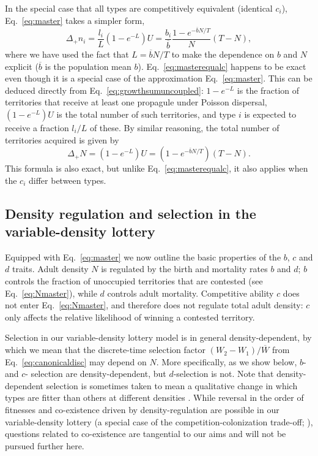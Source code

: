 \documentclass[12pt]{article}
\begin{document}
In the special case that all types are competitively equivalent (identical $c_i$), Eq.~\eqref{eq:master} takes a simpler form,
\begin{equation}
\Delta_+ n_i = \frac{l_i}{L}(1-e^{-L})U=\frac{b_i}{\overline{b}}\frac{1-e^{-\overline{b}N/T}}{N}(T-N), \label{eq:masterequalc}
\end{equation}
where we have used the fact that $L=\overline{b}N/T$ to make the dependence on $b$ and $N$ explicit ($\overline{b}$ is the population mean $b$). Eq.~\eqref{eq:masterequalc} happens to be exact even though it is a special case of the approximation Eq.~\eqref{eq:master}. This can be deduced directly from Eq.~\eqref{eq:growthsumuncoupled}: $1-e^{-L}$ is the fraction of territories that receive at least one propagule under Poisson dispersal, $(1-e^{-L})U$ is the total number of such territories, and type $i$ is expected to receive a fraction $l_i/L$ of these. By similar reasoning, the total number of territories acquired is given by
\begin{equation}
\Delta_+ N=(1-e^{-L})U=(1-e^{-\overline{b}N/T})(T-N). \label{eq:Nmaster}
\end{equation}
This formula is also exact, but unlike Eq.~\eqref{eq:masterequalc}, it also applies when the $c_i$ differ between types. 

\subsection*{Density regulation and selection in the variable-density lottery}

Equipped with Eq.~\eqref{eq:master} we now outline the basic properties of the $b$, $c$ and $d$ traits. Adult density $N$ is regulated by the birth and mortality rates $b$ and $d$; $b$ controls the fraction of unoccupied territories that are contested (see Eq.~\eqref{eq:Nmaster}), while $d$ controls adult mortality. Competitive ability $c$ does not enter Eq.~\eqref{eq:Nmaster}, and therefore does not regulate total adult density: $c$ only affects the relative likelihood of winning a contested territory.

Selection in our variable-density lottery model is in general density-dependent, by which we mean that the discrete-time selection factor $(W_2-W_1)/\overline{W}$ from Eq.~\eqref{eq:canonicaldisc} may depend on $N$. More specifically, as we show below, $b$- and $c$- selection are density-dependent, but $d$-selection is not. Note that density-dependent selection is sometimes taken to mean a qualitative change in which types are fitter than others at different densities \citep{travis_2013}. While reversal in the order of fitnesses and co-existence driven by density-regulation are possible in our variable-density lottery (a special case of the competition-colonization trade-off; \citealt{levins_71,tilman_94,bolker_99}), questions related to co-existence are tangential to our aims and will not be pursued further here.
\end{document}
